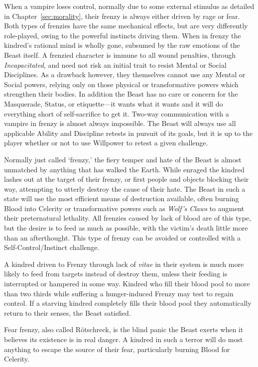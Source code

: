 When a vampire loses control, normally due to some external stimulus as detailed in 
Chapter~\ref{sec:morality}, their frenzy is always either driven by rage or fear.  Both types of 
frenzies have the same mechanical effects, but are very differently role-played, owing to the 
powerful instincts driving them.  When in frenzy the kindred's rational mind is wholly gone, 
subsumed by the raw emotions of the Beast itself.  A frenzied character is immune to all wound 
penalties, through \emph{Incapacitated}, and need not risk an initial trait to resist Mental 
or Social Disciplines.  As a drawback however, they themselves cannot use any Mental or Social powers, 
relying only on those physical or transformative powers which strengthen their bodies.  In addition 
the Beast has no care or concern for the Masquerade, Status, or etiquette---it wants what it wants and 
it will do everything short of self-sacrifice to get it.  Two-way communication with a vampire in 
frenzy is almost always impossible.  The Beast will always use all applicable Ability and Discipline 
retests in pursuit of its goals, but it is up to the player whether or not to use Willpower to retest 
a given challenge.

Normally just called `frenzy,' the fiery temper and hate of the Beast is almost unmatched by anything 
that has walked the Earth.  While enraged the kindred lashes out at the target of their frenzy, or 
first people and objects blocking their way, attempting to utterly destroy the cause of their hate.  
The Beast in such a state will use the most efficient means of destruction available, often burning 
Blood into Celerity or transformative powers such as \emph{Wolf's Claws} to augment their 
preternatural lethality.  All frenzies caused by lack of blood are of this type, but the desire is to 
feed as much as possible, with the victim's death little more than an afterthought.  This type of frenzy 
can be avoided or controlled with a Self-Control/Instinct challenge.

A kindred driven to Frenzy through lack of \emph{vitae} in their system is much more likely to feed 
from targets instead of destroy them, unless their feeding is interrupted or hampered in some way.  
Kindred who fill their blood pool to more than two thirds while suffering a hunger-induced Frenzy 
may test to regain control.  If a starving kindred completely fills their blood pool they automatically 
return to their senses, the Beast satisfied.

Fear frenzy, also called R\"{o}tschreck, is the blind panic the Beast exerts when it believes its 
existence is in real danger.  A kindred in such a terror will do most anything to escape the source 
of their fear, particularly burning Blood for Celerity.

